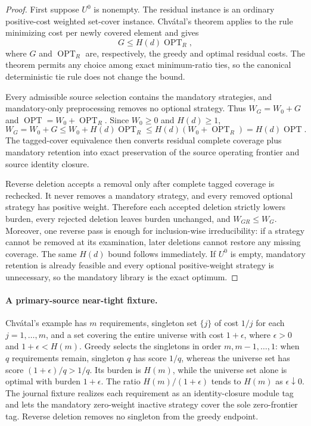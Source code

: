 \begin{proof}
First suppose $U^0$ is nonempty.  The residual instance is an ordinary
positive-cost weighted set-cover instance.  Chv\'atal's theorem applies to
the rule minimizing cost per newly covered element and gives
\[
 G\leq H(d)\operatorname{OPT}_R,
\]
where $G$ and $\operatorname{OPT}_R$ are, respectively, the greedy and
optimal residual costs.  The theorem permits any choice among exact
minimum-ratio ties, so the canonical deterministic tie rule does not change
the bound.

Every admissible source selection contains the mandatory strategies, and
mandatory-only preprocessing removes no optional strategy.  Thus
$W_G=W_0+G$ and
$\operatorname{OPT}=W_0+\operatorname{OPT}_R$.  Since $W_0\geq0$ and
$H(d)\geq1$,
\[
 W_G=W_0+G
 \leq W_0+H(d)\operatorname{OPT}_R
 \leq H(d)(W_0+\operatorname{OPT}_R)
 =H(d)\operatorname{OPT}.
\]
The tagged-cover equivalence then converts residual complete coverage plus
mandatory retention into exact preservation of the source operating frontier
and source identity closure.

Reverse deletion accepts a removal only after complete tagged coverage is
rechecked.  It never removes a mandatory strategy, and every removed optional
strategy has positive weight.  Therefore each accepted deletion strictly
lowers burden, every rejected deletion leaves burden unchanged, and
$W_{GR}\leq W_G$.  Moreover, one reverse pass is enough for
inclusion-wise irreducibility: if a strategy cannot be removed at its
examination, later deletions cannot restore any missing coverage.  The same
$H(d)$ bound follows immediately.  If $U^0$ is empty, mandatory retention is
already feasible and every optional positive-weight strategy is unnecessary,
so the mandatory library is the exact optimum.
\end{proof}

\paragraph{A primary-source near-tight fixture.}
Chv\'atal's example has $m$ requirements, singleton set $\{j\}$ of cost
$1/j$ for each $j=1,\ldots,m$, and a set covering the entire universe with
cost $1+\epsilon$, where $\epsilon>0$ and
$1+\epsilon<H(m)$.  Greedy selects the singletons in order
$m,m-1,\ldots,1$: when $q$ requirements remain, singleton $q$ has score
$1/q$, whereas the universe set has score $(1+\epsilon)/q>1/q$.  Its burden
is $H(m)$, while the universe set alone is optimal with burden
$1+\epsilon$.  The ratio $H(m)/(1+\epsilon)$ tends to $H(m)$ as
$\epsilon\downarrow0$.  The journal fixture realizes each requirement as an
identity-closure module tag and lets the mandatory zero-weight inactive
strategy cover the sole zero-frontier tag.  Reverse deletion removes no
singleton from the greedy endpoint.

